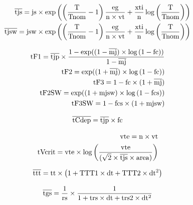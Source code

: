 \begin{eqnarray}
\rm{\overline{tjs} = js\times \exp\left(
     \left(\frac{T}{Tnom}-1\right)\frac{eg}{n\times vt}
     +\frac{xti}{n}\log\left(\frac{T}{Tnom}\right) \right)}\nonumber \\
\rm{\overline{tjsw} = jsw\times \exp\left(
     \left(\frac{T}{Tnom}-1\right)\frac{eg}{n\times vt}
     +\frac{xti}{n}\log\left(\frac{T}{Tnom}\right) \right)}\nonumber										
\end{eqnarray}

\begin{eqnarray}
\rm{tF1=\overline{tjp}\times
                    \frac{1-exp((1-\overline{mj})\times \log\left(1- fc\right))}{1-\overline{mj}}
										}\nonumber \\		
\rm{tF2=exp((1+\overline{mj})\times \log\left(1- fc\right))}\nonumber \\
\rm{tF3=1-fc\times(1+\overline{mj})}\nonumber \\
\rm{tF2SW=exp((1+mjsw)\times \log\left(1- fcs\right))}\nonumber \\
\rm{tF3SW=1-fcs\times(1+mjsw)}\nonumber 																										
\end{eqnarray}

\begin{eqnarray}
\rm{\overline{tCdep}=\overline{tjp}\times fc}\nonumber 								
\end{eqnarray}

\begin{eqnarray}
\rm{vte = n\times vt}\nonumber \\		
\rm{tVcrit=vte\times \log\left(\frac{vte}{(\sqrt{2}\times \overline{tjs}\times area)}\right)}\nonumber 						
\end{eqnarray}

\begin{eqnarray}
\rm{\overline{ttt}=tt\times \left( 1+TTT1\times dt + TTT2\times dt^2 \right)}\nonumber 								
\end{eqnarray}

\begin{eqnarray}
\rm{\overline{tgs}=\frac{1}{rs}\times \frac{1}{1+trs\times dt+trs2\times dt^2}}\nonumber 								
\end{eqnarray}



